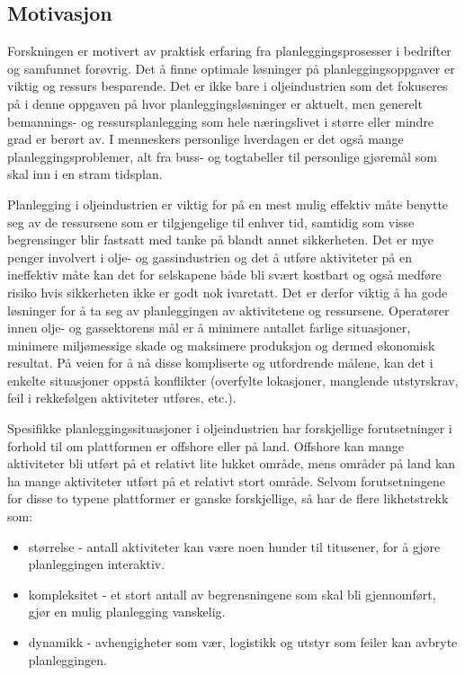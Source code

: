 \subsection{Motivasjon}
Forskningen er motivert av praktisk erfaring fra planleggingsprosesser i bedrifter og samfunnet forøvrig. Det å finne optimale løsninger på planleggingsoppgaver er viktig og ressurs besparende. Det er ikke bare i oljeindustrien som det fokuseres på i denne oppgaven på hvor planleggingsløsninger er aktuelt, men generelt bemannings- og ressursplanlegging som hele næringslivet i større eller mindre grad er berørt av. I menneskers personlige hverdagen er det også mange planleggingsproblemer, alt fra buss- og togtabeller til personlige gjøremål som skal inn i en stram tidsplan.

Planlegging i oljeindustrien er viktig for på en mest mulig effektiv måte benytte seg av de ressursene som er tilgjengelige til enhver tid, samtidig som visse begrensinger blir fastsatt med tanke på blandt annet sikkerheten. Det er mye penger involvert i olje- og gassindustrien og det å utføre aktiviteter på en ineffektiv måte kan det for selskapene både bli svært kostbart og også medføre risiko hvis sikkerheten ikke er godt nok ivaretatt. Det er derfor viktig å ha gode løsninger for å ta seg av planleggingen av aktivitetene og ressursene. Operatører innen olje- og gassektorens mål er å minimere antallet farlige situasjoner, minimere miljømessige skade og maksimere produksjon og dermed økonomisk resultat. På veien for å nå disse kompliserte og utfordrende målene, kan det i enkelte situasjoner oppstå konflikter (overfylte lokasjoner, manglende utstyrskrav, feil i rekkefølgen aktiviteter utføres, etc.).

Spesifikke planleggingssituasjoner i oljeindustrien har forskjellige forutsetninger i forhold til om plattformen er offshore eller på land. Offshore kan mange aktiviteter bli utført på et relativt lite lukket område, mens områder på land kan ha mange aktiviteter utført på et relativt stort område. Selvom forutsetningene for disse to typene plattformer er ganske forskjellige, så har de flere likhetstrekk som:
\begin{itemize}
\item størrelse - antall aktiviteter kan være noen hunder til titusener, for å gjøre planleggingen interaktiv.
\item kompleksitet - et stort antall av begrensningene som skal bli gjennomført, gjør en mulig planlegging vanskelig.
\item dynamikk - avhengigheter som vær, logistikk og utstyr som feiler kan avbryte planleggingen.
\end{itemize}

